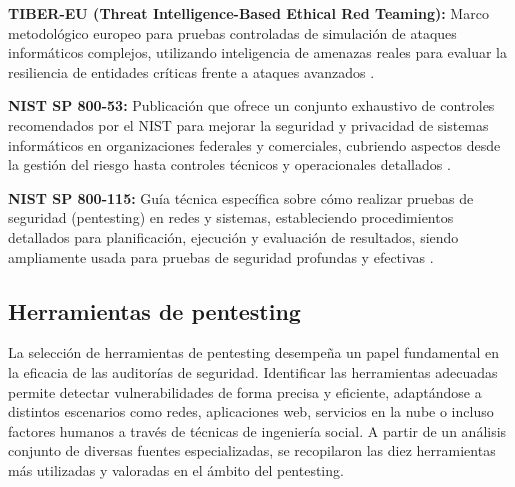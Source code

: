 \documentclass[a4paper, 10pt]{article}
\begin{document}
\textbf{TIBER-EU (Threat Intelligence-Based Ethical Red Teaming):} Marco metodológico europeo para pruebas controladas de simulación de ataques informáticos complejos, utilizando inteligencia de amenazas reales para evaluar la resiliencia de entidades críticas frente a ataques avanzados \cite{tibereu}.
\par\vspace{0.5cm}

\textbf{NIST SP 800-53:} Publicación que ofrece un conjunto exhaustivo de controles recomendados por el NIST para mejorar la seguridad y privacidad de sistemas informáticos en organizaciones federales y comerciales, cubriendo aspectos desde la gestión del riesgo hasta controles técnicos y operacionales detallados \cite{nist80053}.
\par\vspace{0.5cm}

\textbf{NIST SP 800-115:} Guía técnica específica sobre cómo realizar pruebas de seguridad (pentesting) en redes y sistemas, estableciendo procedimientos detallados para planificación, ejecución y evaluación de resultados, siendo ampliamente usada para pruebas de seguridad profundas y efectivas \cite{nist800115}.
\par\vspace{0.5cm}


\subsection{Herramientas de pentesting}

La selección de herramientas de pentesting desempeña un papel fundamental en la eficacia de las auditorías de seguridad. Identificar las herramientas adecuadas permite detectar vulnerabilidades de forma precisa y eficiente, adaptándose a distintos escenarios 
como redes, aplicaciones web, servicios en la nube o incluso factores humanos a través de técnicas de ingeniería social. A partir de un análisis conjunto de diversas fuentes especializadas, se recopilaron las diez herramientas 
más utilizadas y valoradas en el ámbito del pentesting. \cite{felipe2024}
\end{document}
